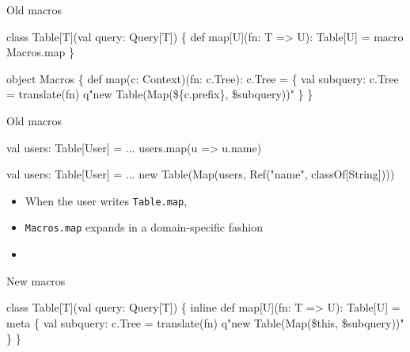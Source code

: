 \documentclass[svgnames,dvipsnames,hyperref={bookmarks=false},usepdftitle=false]{beamer}
\begin{document}
\begin{frame}[fragile]{Old macros}
\begin{semiverbatim}
class Table[T](val query: Query[T]) \{
  def map[U](fn: T => U): Table[U] = macro Macros.map
\}

object Macros \{
  def map(c: Context)(fn: c.Tree): c.Tree = \{
    val subquery: c.Tree = translate(fn)
    q"new Table(Map(\$\{c.prefix\}, \$subquery))"
  \}
\}
\end{semiverbatim}
\end{frame}

\begin{frame}[fragile]{Old macros}
\begin{semiverbatim}
val users: Table[User] = ...
users.map(u => u.name)

                          \arrowdown

val users: Table[User] = ...
new Table(Map(users, Ref("name", classOf[String])))

\end{semiverbatim}

\begin{itemize}
\item When the user writes \texttt{Table.map}, 
\item \texttt{Macros.map} expands in a domain-specific fashion
\item {}
\end{itemize}
\end{frame}

\begin{frame}[fragile]{New macros}
\begin{semiverbatim}
class Table[T](val query: Query[T]) \{
  inline def map[U](fn: T => U): Table[U] = meta \{
    val subquery: c.Tree = translate(fn)
    q"new Table(Map(\$this, \$subquery))"
  \}
\}
\end{semiverbatim}
\end{frame}
\end{document}

